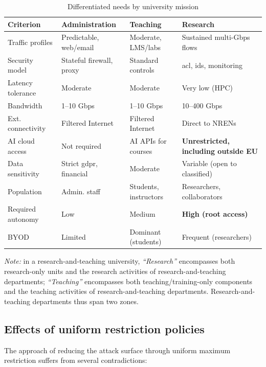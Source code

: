 \begin{table}[H]
\centering
\caption{Differentiated needs by university mission}
\label{tab:besoins}
\small
\begin{tabularx}{\textwidth}{l X X X}
\toprule
\textbf{Criterion} & \textbf{Administration} & \textbf{Teaching} & \textbf{Research} \\
\midrule
Traffic profiles & Predictable, web/email & Moderate, LMS/labs & Sustained multi-Gbps flows \\
\addlinespace
Security model & Stateful firewall, proxy & Standard controls & \gls{acl}, \gls{ids}, monitoring \\
\addlinespace
Latency tolerance & Moderate & Moderate & Very low (HPC) \\
\addlinespace
Bandwidth & 1--10 Gbps & 1--10 Gbps & 10--400 Gbps \\
\addlinespace
Ext. connectivity & Filtered Internet & Filtered Internet & Direct to NRENs \\
\addlinespace
AI cloud access & Not required & AI APIs for courses & \textbf{Unrestricted, including outside EU} \\
\addlinespace
Data sensitivity & Strict \gls{gdpr}, financial & Moderate & Variable (open to classified) \\
\addlinespace
Population & Admin. staff & Students, instructors & Researchers, collaborators \\
\addlinespace
Required autonomy & Low & Medium & \textbf{High (root access)} \\
\addlinespace
BYOD & Limited & Dominant (students) & Frequent (researchers) \\
\bottomrule
\end{tabularx}
\end{table}

\noindent\emph{Note:} in a research-and-teaching university,
\emph{``Research''} encompasses both research-only units and the research
activities of research-and-teaching departments; \emph{``Teaching''}
encompasses both teaching/training-only components and the teaching
activities of research-and-teaching departments.
Research-and-teaching departments thus span two zones.

\subsection{Effects of uniform restriction policies}

The approach of reducing the attack surface through uniform maximum restriction
suffers from several contradictions:

